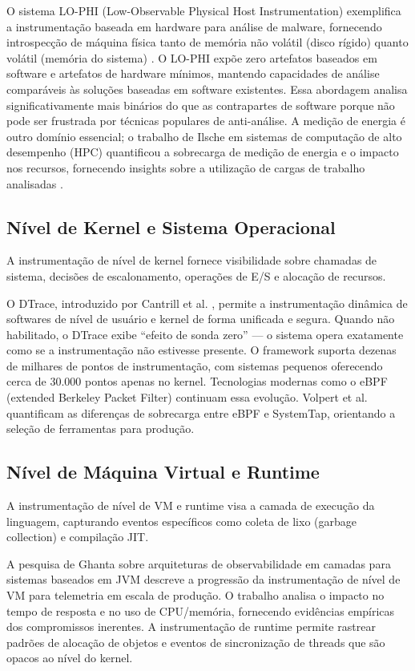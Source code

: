 \documentclass[sigconf, anonymous]{acmart}
\begin{document}
O sistema LO-PHI (Low-Observable Physical Host Instrumentation) exemplifica a instrumentação baseada em hardware para análise de malware, fornecendo introspecção de máquina física tanto de memória não volátil (disco rígido) quanto volátil (memória do sistema) \cite{spensky_2016}. O LO-PHI expõe zero artefatos baseados em software e artefatos de hardware mínimos, mantendo capacidades de análise comparáveis às soluções baseadas em software existentes. Essa abordagem analisa significativamente mais binários do que as contrapartes de software porque não pode ser frustrada por técnicas populares de anti-análise. A medição de energia é outro domínio essencial; o trabalho de Ilsche em sistemas de computação de alto desempenho (HPC) quantificou a sobrecarga de medição de energia e o impacto nos recursos, fornecendo insights sobre a utilização de cargas de trabalho analisadas \cite{ilsche_2020}.

\subsection{Nível de Kernel e Sistema Operacional}
A instrumentação de nível de kernel fornece visibilidade sobre chamadas de sistema, decisões de escalonamento, operações de E/S e alocação de recursos.

O DTrace, introduzido por Cantrill et al. \cite{cantrill_2004}, permite a instrumentação dinâmica de softwares de nível de usuário e kernel de forma unificada e segura. Quando não habilitado, o DTrace exibe ``efeito de sonda zero'' — o sistema opera exatamente como se a instrumentação não estivesse presente. O framework suporta dezenas de milhares de pontos de instrumentação, com sistemas pequenos oferecendo cerca de 30.000 pontos apenas no kernel. Tecnologias modernas como o eBPF (extended Berkeley Packet Filter) continuam essa evolução. Volpert et al. \cite{volpert_2025} quantificam as diferenças de sobrecarga entre eBPF e SystemTap, orientando a seleção de ferramentas para produção.

\subsection{Nível de Máquina Virtual e Runtime}
A instrumentação de nível de VM e runtime visa a camada de execução da linguagem, capturando eventos específicos como coleta de lixo (garbage collection) e compilação JIT.

A pesquisa de Ghanta \cite{ghanta_2017} sobre arquiteturas de observabilidade em camadas para sistemas baseados em JVM descreve a progressão da instrumentação de nível de VM para telemetria em escala de produção. O trabalho analisa o impacto no tempo de resposta e no uso de CPU/memória, fornecendo evidências empíricas dos compromissos inerentes. A instrumentação de runtime permite rastrear padrões de alocação de objetos e eventos de sincronização de threads que são opacos ao nível do kernel.
\end{document}
